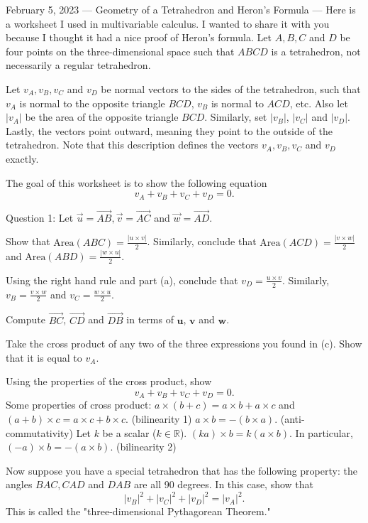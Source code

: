February 5, 2023
---
Geometry of a Tetrahedron and Heron's Formula
---
Here is a worksheet I used in multivariable calculus. I wanted to share it with you because I thought it had a nice proof of Heron's formula.
Let $A,B,C$ and $D$ be four points on the three-dimensional space such that $ABCD$ is a tetrahedron, not necessarily a regular tetrahedron.

Let  $v_A, v_B, v_C$ and $v_D$ be normal vectors to the sides of the tetrahedron, such that $v_A$ is normal to the opposite triangle $BCD$, $v_B$ is normal to $ACD$, etc. Also let $|v_A|$ be the area of the opposite triangle $BCD$. Similarly, set $|v_B|$, $|v_C|$ and $|v_D|$. Lastly, the vectors point outward, meaning they point to the outside of the tetrahedron. Note that this description defines the vectors $v_A, v_B, v_C$ and $v_D$ exactly.

The goal of this worksheet is to show the following equation $$v_A+v_B+v_C+v_D = 0.$$ 

Question 1: Let $\overset{\rightarrow}{u} = \overset{\rightarrow}{AB}, \overset{\rightarrow}{v} = \overset{\rightarrow}{AC}$ and $\overset{\rightarrow}{w} = \overset{\rightarrow}{AD}.$ 

Show that $\textrm{Area}(ABC) = \frac{|u\times v|}{2}$. Similarly, conclude that $\textrm{Area}(ACD) = \frac{|v\times w|}{2}$ and $\textrm{Area}(ABD) = \frac{|w\times u|}{2}$. 

Using the right hand rule and part (a), conclude that $v_D = \frac{u\times v}{2}$. Similarly, $v_B = \frac{v\times w}{2}$ and $v_C = \frac{w\times u}{2}$. 

Compute $\overset{\rightarrow}{BC}$, $\overset{\rightarrow}{CD}$ and $\overset{\rightarrow}{DB}$ in terms of $\textbf{u}$, $\textbf{v}$ and $\textbf{w}$. 

Take the cross product of any two of the three expressions you found in (c). Show that it is equal to $v_A.$

Using the properties of the cross product, show $$v_A + v_B + v_C + v_D = 0.$$ Some properties of cross product:
$a\times (b+c) = a\times b + a\times c$ and $(a+b) \times c = a\times c + b\times c.$ (bilinearity 1) 
$a\times b = - (b\times a).$ (anti-commutativity)
Let $k$ be a scalar ($k\in \mathbb{R}$). $(ka) \times b = k(a\times b).$ In particular, $(-a)\times b = -(a\times b).$ (bilinearity 2)

Now suppose you have a special tetrahedron that has the following property: the angles $BAC, CAD$ and $DAB$ are all 90 degrees. In this case, show that $$|v_B|^2+|v_C|^2+|v_D|^2 = |v_A|^2.$$ This is called the "three-dimensional Pythagorean Theorem."